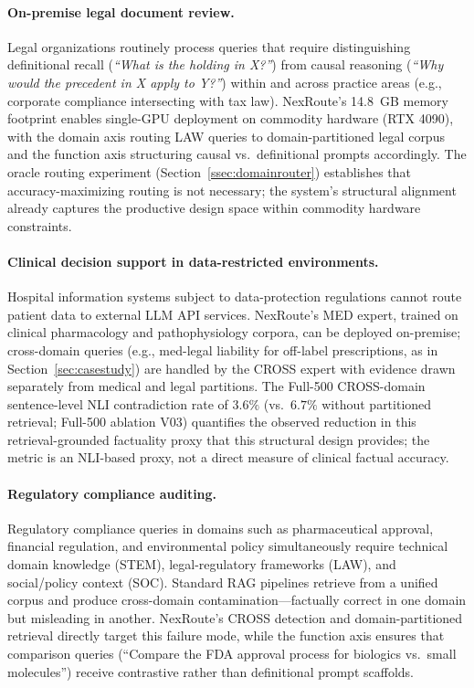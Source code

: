 \documentclass[a4paper,fleql,doubleblind]{cas-sc}
\begin{document}
\paragraph{On-premise legal document review.}
Legal organizations routinely process queries that require distinguishing definitional
recall (\textit{``What is the holding in X?''}) from causal reasoning
(\textit{``Why would the precedent in X apply to Y?''}) within and across practice
areas (e.g., corporate compliance intersecting with tax law).
NexRoute's 14.8~GB memory footprint enables single-GPU deployment on commodity hardware
(RTX 4090), with the domain axis routing LAW queries to domain-partitioned legal
corpus and the function axis structuring causal vs.\ definitional prompts
accordingly.
The oracle routing experiment (Section~\ref{ssec:domainrouter}) establishes that
accuracy-maximizing routing is not necessary; the system's structural alignment
already captures the productive design space within commodity hardware constraints.

\paragraph{Clinical decision support in data-restricted environments.}
Hospital information systems subject to data-protection regulations cannot route
patient data to external LLM API services.
NexRoute's MED expert, trained on clinical pharmacology and pathophysiology corpora,
can be deployed on-premise; cross-domain queries (e.g., med-legal liability for
off-label prescriptions, as in Section~\ref{sec:casestudy}) are handled by the
CROSS expert with evidence drawn separately from medical and legal partitions.
The Full-500 CROSS-domain sentence-level NLI contradiction rate of $3.6\%$
(vs.\ $6.7\%$ without partitioned retrieval; Full-500 ablation V03)
quantifies the observed reduction in this retrieval-grounded factuality proxy
that this structural design provides; the metric is an NLI-based proxy,
not a direct measure of clinical factual accuracy.

\paragraph{Regulatory compliance auditing.}
Regulatory compliance queries in domains such as pharmaceutical approval,
financial regulation, and environmental policy simultaneously require technical
domain knowledge (STEM), legal-regulatory frameworks (LAW), and social/policy
context (SOC). Standard RAG pipelines retrieve from a unified corpus and produce
cross-domain contamination---factually correct in one domain but misleading in
another. NexRoute's CROSS detection and domain-partitioned retrieval directly
target this failure mode, while the function axis ensures that comparison queries
(``Compare the FDA approval process for biologics vs.\ small molecules'') receive
contrastive rather than definitional prompt scaffolds.
\end{document}
